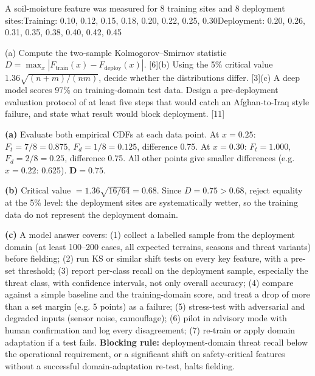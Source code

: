 \documentclass[11pt]{article}
\begin{document}
\begin{prob}A soil-moisture feature was measured for 8 training sites and 8 deployment sites:\newline Training: 0.10, 0.12, 0.15, 0.18, 0.20, 0.22, 0.25, 0.30\newline Deployment: 0.20, 0.26, 0.31, 0.35, 0.38, 0.40, 0.42, 0.45

(a) Compute the two-sample Kolmogorov--Smirnov statistic $D=\max_x|F_{\text{train}}(x)-F_{\text{deploy}}(x)|$. [6]\newline (b) Using the 5\% critical value $1.36\sqrt{(n+m)/(nm)}$, decide whether the distributions differ. [3]\newline (c) A deep model scores 97\% on training-domain test data. Design a pre-deployment evaluation protocol of at least five steps that would catch an Afghan-to-Iraq style failure, and state what result would block deployment. [11]\end{prob}

\begin{soln}\textbf{(a)} Evaluate both empirical CDFs at each data point. At $x=0.25$: $F_t=7/8=0.875$, $F_d=1/8=0.125$, difference 0.75. At $x=0.30$: $F_t=1.000$, $F_d=2/8=0.25$, difference 0.75. All other points give smaller differences (e.g. $x=0.22$: 0.625). $\mathbf{D=0.75}$.

\textbf{(b)} Critical value $=1.36\sqrt{16/64}=0.68$. Since $D=0.75>0.68$, reject equality at the 5\% level: the deployment sites are systematically wetter, so the training data do not represent the deployment domain.

\textbf{(c)} A model answer covers: (1) collect a labelled sample from the deployment domain (at least 100--200 cases, all expected terrains, seasons and threat variants) before fielding; (2) run KS or similar shift tests on every key feature, with a pre-set threshold; (3) report per-class recall on the deployment sample, especially the threat class, with confidence intervals, not only overall accuracy; (4) compare against a simple baseline and the training-domain score, and treat a drop of more than a set margin (e.g. 5 points) as a failure; (5) stress-test with adversarial and degraded inputs (sensor noise, camouflage); (6) pilot in advisory mode with human confirmation and log every disagreement; (7) re-train or apply domain adaptation if a test fails. \textbf{Blocking rule:} deployment-domain threat recall below the operational requirement, or a significant shift on safety-critical features without a successful domain-adaptation re-test, halts fielding.\end{soln}
\end{document}

